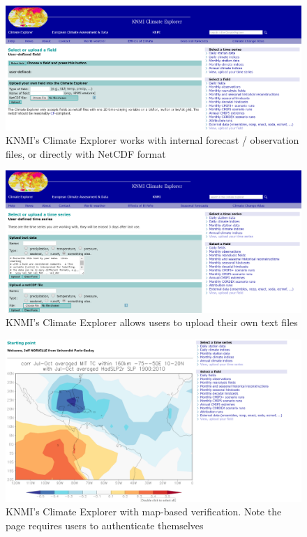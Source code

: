 \documentclass[logos,parttoc,morelanguage=french,morelanguage=german]{orsay-memoire}
\begin{document}
\begin{figure}[hp]
\centering
\includegraphics[width=0.80\linewidth]{images/vfsbKNMI1.png}
  \caption{KNMI's Climate Explorer works with internal forecast / observation files, or directly with NetCDF format}
  \label{fig:vfsbKNMI1}
\end{figure}

\begin{figure}[hp]
\centering
\includegraphics[width=0.80\linewidth]{images/vfsbKNMI2.png}
  \caption{KNMI's Climate Explorer allows users to upload their own text files}
  \label{fig:vfsbKNMI2}
\end{figure}

\begin{figure}[hp]
\centering
\includegraphics[width=0.80\linewidth]{images/vfsbKNMI3.png}
  \caption{KNMI's Climate Explorer with map-based verification. Note the page requires users to authenticate themselves}
  \label{fig:vfsbKNMI3}
\end{figure}
\end{document}
